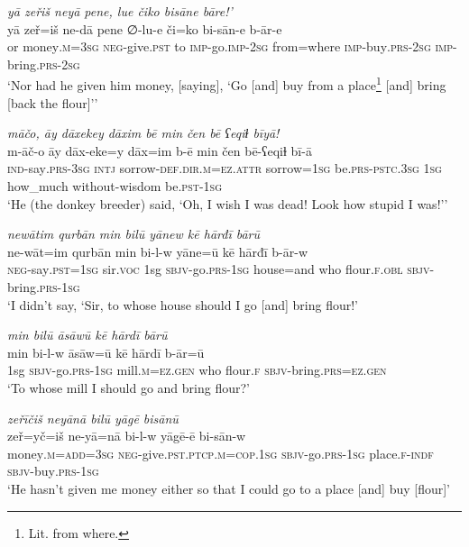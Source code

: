 \ea \label{HB.18}
\textit{yā zeřiš neyā pene, lue čiko bisāne bāre!’} \\ 
\gll yā zeř=iš ne-dā pene ∅-lu-e či=ko bi-sān-e b-ār-e \\ 
 or money\textsc{.m}\textsc{=3sg} \textsc{neg-}give\textsc{.pst} to \textsc{imp-}go.\textsc{imp-}\textsc{2sg} from=where \textsc{imp-}buy\textsc{.prs}-\textsc{2sg} \textsc{imp-}bring\textsc{.prs}-\textsc{2sg} \\ 
\glt `Nor had he given him money, [saying], ‘Go [and] buy from a place\footnote{Lit. from where.} [and] bring [back the flour]’'
\z 
 
\ea \label{HB.19}
\textit{māčo, āy dāxekey dāxim bē min čen bē ʕeqiɫ bīyā!} \\ 
\gll m-āč-o āy dāx-eke=y dāx=im b-ē min čen bē-ʕeqiɫ bī-ā \\ 
 \textsc{ind-}say\textsc{.prs}\textsc{-3sg} \textsc{intj} sorrow\textsc{-def}\textsc{.dir}\textsc{.m}\textsc{=ez}.\textsc{attr} sorrow\textsc{=1sg} be\textsc{.prs}\textsc{-pstc}\textsc{.3sg} \textsc{1sg} how\_much without-wisdom be\textsc{.pst}\textsc{-1sg} \\ 
\glt `He (the donkey breeder) said, ‘Oh, I wish I was dead! Look how stupid I was!’'
\z 
 
\ea \label{HB.20}
\textit{newātim qurbān min bilū yānew kē hārđī bārū} \\ 
\gll ne-wāt=im qurbān min bi-l-w yāne=ū kē hārđī b-ār-w \\ 
 \textsc{neg-}say\textsc{.pst}\textsc{=1sg} sir.\textsc{voc} 1sg \textsc{sbjv-}go\textsc{.prs}\textsc{-1sg} house=and who flour\textsc{\textsc{.f}}\textsc{.obl} \textsc{sbjv-}bring\textsc{.prs}\textsc{-1sg} \\ 
\glt `I didn’t say, ‘Sir, to whose house should I go [and] bring flour!'
\z 
 
\ea \label{HB.21}
\textit{min bilū āsāwū kē hārdī bārū} \\ 
\gll min bi-l-w āsāw=ū kē hārdī b-ār=ū \\ 
 1sg \textsc{sbjv-}go\textsc{.prs}\textsc{-1sg} mill\textsc{.m}\textsc{=ez}\textsc{.gen} who flour\textsc{\textsc{.f}} \textsc{sbjv-}bring\textsc{.prs}\textsc{=ez}\textsc{.gen} \\ 
\glt `To whose mill I should go and bring flour?'
\z 
 
\ea \label{HB.22}
\textit{zeřīčiš neyānā bilū yāgē bisānū} \\ 
\gll zeř=yč=iš ne-yā=nā bi-l-w yāgē-ē bi-sān-w \\ 
 money\textsc{.m}\textsc{=add}\textsc{=3sg} \textsc{neg-}give\textsc{.pst}\textsc{.ptcp}\textsc{.m}\textsc{=cop}\textsc{.1sg} \textsc{sbjv-}go\textsc{.prs}\textsc{-1sg} place\textsc{\textsc{.f}}\textsc{-indf} \textsc{sbjv-}buy\textsc{.prs}\textsc{-1sg} \\ 
\glt `He hasn’t given me money either so that I could go to a place [and] buy [flour]'
\z 
 
